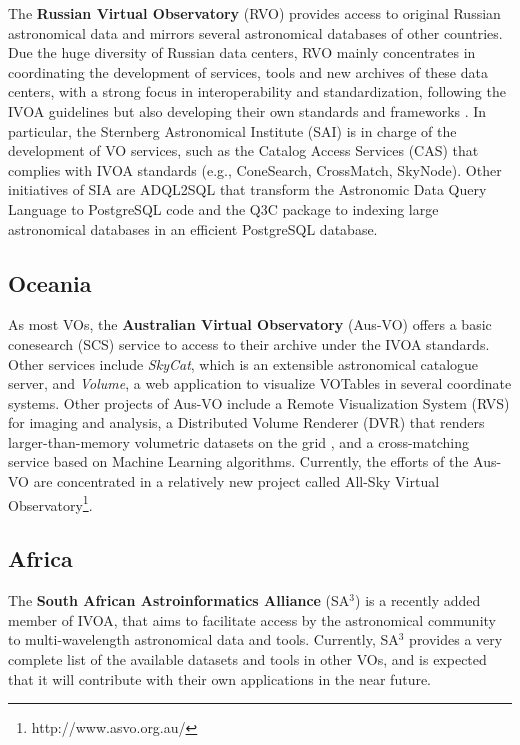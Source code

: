 The \textbf{Russian Virtual Observatory} (RVO) provides access to original
Russian astronomical data and mirrors several astronomical databases 
of other countries. Due the huge diversity of Russian data centers,
RVO mainly concentrates in coordinating the development of services,
tools and new archives of these data centers, with a strong focus in
interoperability and standardization, following the IVOA guidelines
but also developing their own standards and frameworks \cite{Briukhov2005}.
In particular, the Sternberg Astronomical Institute (SAI) is
in charge of the development of VO services, such as the Catalog
Access Services (CAS) that complies with IVOA standards (e.g., ConeSearch,
CrossMatch, SkyNode). Other initiatives of SIA are ADQL2SQL that transform
the Astronomic Data Query Language to PostgreSQL code and the Q3C package
to indexing large astronomical databases in an efficient PostgreSQL 
database.

\subsection{Oceania}
As most VOs, the \textbf{Australian Virtual Observatory} (Aus-VO) offers a 
basic conesearch (SCS) service to access to their archive under the
IVOA standards. Other
services include \emph{SkyCat}, which is an extensible 
astronomical catalogue server, 
and \emph{Volume}, a web application to visualize VOTables in several 
coordinate systems.
Other projects of Aus-VO include a Remote Visualization
System (RVS) for imaging and analysis, a 	
Distributed Volume Renderer (DVR) that renders larger-than-memory volumetric 
datasets on the grid \cite{Beeson2003},
and a cross-matching service based on Machine Learning algorithms.
Currently, the efforts of the Aus-VO are concentrated in a relatively
new project called All-Sky Virtual 
Observatory\footnote{http://www.asvo.org.au/}.

\subsection{Africa}
The \textbf{South African Astroinformatics Alliance} (SA$^3$) 
is a recently added member of IVOA, that aims 
to facilitate access by the astronomical community to
multi-wavelength astronomical data and tools.
Currently, SA$^3$ provides a very complete list of the available datasets and
tools in other VOs, and is expected that it will contribute with their own
applications in the near future.

